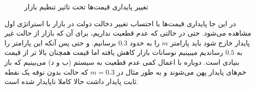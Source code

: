\documentclass[13pt,onecolumn,a4paper]{article}
\begin{document}
\begin{figure}[H]
	\centering
	\hfil
	
	\medskip
	\hfil
	
	\caption{تغییر پایداری قیمت‌ها تحت تاثیر تنظیم بازار }
	\label{fig:myfigure}
\end{figure}
	در این جا پایداری قیمت‌ها با احتساب تغییر دخالت دولت در بازار با استراتژی اول مشاهده می‌شود. حتی در حالتی که عدم قطعیت نداریم، برای آن که بازار از حالت غیر پایدار خارج شود باید پارامتر $m$ را به حدود $0.3$ برسانیم. و حتی پس آنکه این پارامتر را به $0.5$ رساندیم میبینیم نوسانات بازار کاهش یافته اما قیمت همچنان بالا تر از قیمت بنیادی است. دوباره با اعمال کمی عدم قطعیت به سیستم (ب و د) می‌بینیم که باز خم‌های پایدار پهن می‌شوند و به طور مثال در $m=0.3$ که حالت بدون نوفه یک نقطه ثابت پایدار داشت حالا کاملا ناپایدار شده است.
	
\end{document}
